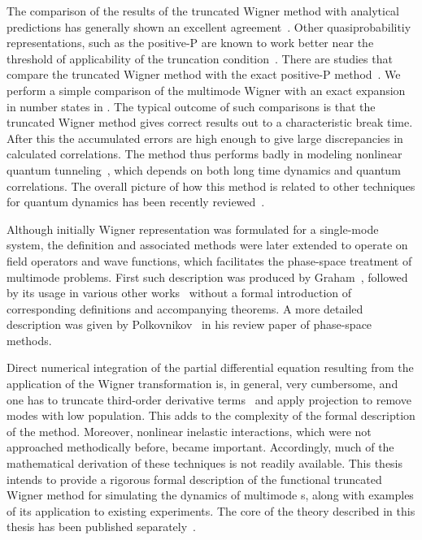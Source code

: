The comparison of the results of the truncated Wigner method with analytical predictions has generally shown an excellent agreement~\cite{Corney2006,Deuar2007}.
Other quasiprobabilitiy representations, such as the positive-P are known to work better near the threshold of applicability of the truncation condition~\cite{Deuar2007,Hoffmann2008}.
There are studies that compare the truncated Wigner method with the exact positive-P method~\cite{Chaturvedi2002,Dechoum2004}.
We perform a simple comparison of the multimode Wigner with an exact expansion in number states in .
The typical outcome of such comparisons is that the truncated Wigner method gives correct results out to a characteristic break time.
After this the accumulated errors are high enough to give large discrepancies in calculated correlations.
The method thus performs badly in modeling nonlinear quantum tunneling~\cite{Drummond1989,Kinsler1991a}, which depends on both long time dynamics and quantum correlations.
The overall picture of how this method is related to other techniques for quantum dynamics has been recently reviewed~\cite{He2012}.

Although initially Wigner representation was formulated for a single-mode system, the definition and associated methods were later extended to operate on field operators and wave functions,
which facilitates the phase-space treatment of multimode problems.
First such description was produced by Graham~\cite{Graham1970,Graham1970a}, followed by its usage in various other works~\cite{Steel1998,Gardiner2003,Isella2006,Norrie2006,Norrie2006a,Blakie2008,Martin2010} without a formal introduction of corresponding definitions and accompanying theorems.
A more detailed description was given by Polkovnikov~\cite{Polkovnikov2010} in his review paper of phase-space methods.

Direct numerical integration of the partial differential equation resulting from the application of the Wigner transformation is, in general, very cumbersome, and one has to truncate third-order derivative terms~\cite{Drummond1993,Steel1998,Sinatra2002} and apply projection to remove modes with low population.
This adds to the complexity of the formal description of the method.
Moreover, nonlinear inelastic interactions, which were not approached methodically before, became important.
Accordingly, much of the mathematical derivation of these techniques is not readily available.
This thesis intends to provide a rigorous formal description of the functional truncated Wigner method for simulating the dynamics of multimode s, along with examples of its application to existing experiments.
The core of the theory described in this thesis has been published separately~\cite{Opanchuk2013}.


